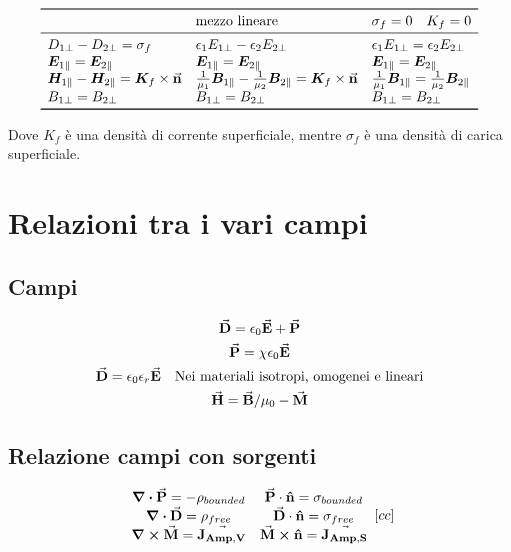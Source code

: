 \documentclass[a4paper]{scrarticle}
\begin{document}
\[
\begin{array}{lll}
    \toprule
    & \text{mezzo lineare} & \sigma_f = 0\quad K_f = 0\\
    \midrule
    D_{1\perp} - D_{2\perp} = \sigma_f & \epsilon_1 E_{1\perp} - \epsilon_2 E_{2\perp} & \epsilon_1 E_{1\perp} = \epsilon_2 E_{2\perp}\\
    \bm E_{1\parallel} = \bm E_{2\parallel} & \bm E_{1\parallel} = \bm E_{2\parallel} & \bm E_{1\parallel} = \bm E_{2\parallel} \\
    \bm H_{1\parallel} - \bm H_{2\parallel} = \bm K_f \times \va n  & \frac{1}{\mu_1}\bm B_{1\parallel} - \frac{1}{\mu_2}\bm B_{2\parallel} = \bm K_f \times \va n & \frac{1}{\mu_1}\bm B_{1\parallel} = \frac{1}{\mu_2}\bm B_{2\parallel} \\
    B_{1\perp} = B_{2\perp} & B_{1\perp} = B_{2\perp} & B_{1\perp} = B_{2\perp} \\
    \bottomrule
\end{array}   
\]

Dove $K_f$ è una densità di corrente superficiale, mentre $\sigma_f$ è una densità di carica superficiale.

\section{Relazioni tra i vari campi}

\subsection{Campi}

\begin{gather}
    \va D = \epsilon_0 \va E + \va P\\
    \va P = \chi\epsilon_0 \va E \\
    \va D = \epsilon_0 \epsilon_r \va E \quad \text{Nei materiali isotropi, omogenei e lineari}\\
    \va H = \va B/\mu_0 - \va M
\end{gather}

\subsection{Relazione campi con sorgenti}
\[
\begin{array}{cc}
    \div {\va P} = - \rho_{bounded} &
    \va P \cdot  \vu n = \sigma_{bounded}\\
    \div {\va D} = \rho_{free} &
    \va D \cdot  \vu n = \sigma_{free}\\
    \curl {\va M} = \va {J_{Amp, V}} &
    \va M \cross \vu n = \va {J_{Amp, S}}
\end{array}[cc]
\]
\end{document}

